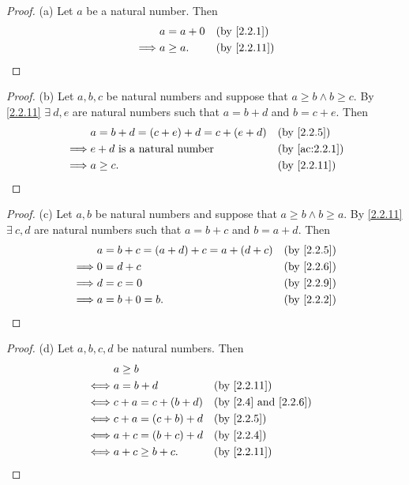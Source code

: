 \begin{proof}{(a)}
  Let \(a\) be a natural number.
  Then
  \begin{align*}
             & a = a + 0 &  & \by{2.2.1}                \\
    \implies & a \geq a. &  & \text{(by \cref{2.2.11})}
  \end{align*}
\end{proof}

\begin{proof}{(b)}
  Let \(a, b, c\) be natural numbers and suppose that \(a \geq b \land b \geq c\).
  By \cref{2.2.11} \(\exists\ d, e\) are natural numbers such that \(a = b + d\) and \(b = c + e\).
  Then
  \begin{align*}
             & a = b + d = (c + e) + d = c + (e + d) &  & \by{2.2.5}                  \\
    \implies & e + d \text{ is a natural number}     &  & \text{(by \cref{ac:2.2.1})} \\
    \implies & a \geq c.                             &  & \text{(by \cref{2.2.11})}   \\
  \end{align*}
\end{proof}

\begin{proof}{(c)}
  Let \(a, b\) be natural numbers and suppose that \(a \geq b \land b \geq a\).
  By \cref{2.2.11} \(\exists\ c, d\) are natural numbers such that \(a = b + c\) and \(b = a + d\).
  Then
  \begin{align*}
             & a = b + c = (a + d) + c = a + (d + c) &  & \by{2.2.5} \\
    \implies & 0 = d + c                             &  & \by{2.2.6} \\
    \implies & d = c = 0                             &  & \by{2.2.9} \\
    \implies & a = b + 0 = b.                        &  & \by{2.2.2}
  \end{align*}
\end{proof}

\begin{proof}{(d)}
  Let \(a, b, c, d\) be natural numbers.
  Then
  \begin{align*}
         & a \geq b                                                         \\
    \iff & a = b + d           &  & \text{(by \cref{2.2.11})}               \\
    \iff & c + a = c + (b + d) &  & \text{(by \cref{2.4} and \cref{2.2.6})} \\
    \iff & c + a = (c + b) + d &  & \by{2.2.5}                              \\
    \iff & a + c = (b + c) + d &  & \by{2.2.4}                              \\
    \iff & a + c \geq b + c.   &  & \text{(by \cref{2.2.11})}
  \end{align*}
\end{proof}

